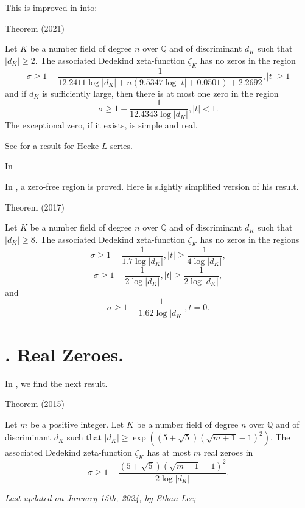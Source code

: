 This is improved in
\cite{Lee*21a}
into:
\par 
\begin{thm}{Theorem (2021)}

    Let $K$ be a number field of degree $n$ over $\mathbb{Q}$ and of
discriminant $d_K$ such that $|d_K| \ge 2$. The associated Dedekind
zeta-function $\zeta_K$ has no zeros in the region
$$
\sigma\ge 1-\frac{1}{12.2411\log|d_K|+n(9.5347\log|t|+0.0501)+2.2692}, |t|\ge1 
$$
and if $d_K$ is sufficiently large, then there is at most one zero in the region
$$
\sigma\ge 1-\frac{1}{12.4343\log|d_K|}, |t|< 1.
$$
The exceptional zero, if it exists, is simple and real.
\end{thm}


See
\cite{Ahn-Kwon*14}
for a result for Hecke $L$-series.

In

In
\cite{Louboutin*17},
a zero-free region is proved. Here is slightly simplified version of
his result.

\par 
\begin{thm}{Theorem (2017)}

Let $K$ be a number field of degree $n$ over $\mathbb{Q}$ and of
discriminant $d_K$ such that $|d_K| \ge 8$. The associated Dedekind
zeta-function $\zeta_K$ has no zeros in the regions
$$
\sigma\ge 1-\frac{1}{1.7\log|d_K|}, |t|\ge\frac{1}{4\log|d_K|},
$$
$$
\sigma\ge 1-\frac{1}{2\log|d_K|}, |t|\ge\frac{1}{2\log|d_K|},
$$
and
$$
\sigma\ge 1-\frac{1}{1.62\log|d_K|}, t=0.
$$
\end{thm}



\section{. Real Zeroes.}


In
\cite{Louboutin*15b},
we find the next result.

\par 
\begin{thm}{Theorem (2015)}

Let $m$ be a positive integer.
  Let $K$ be a number field of degree $n$ over $\mathbb{Q}$ and of
discriminant $d_K$ such that $|d_K|\ge
\exp((5+\sqrt{5})(\sqrt{m+1}-1)^2)$.
The associated Dedekind
zeta-function $\zeta_K$ has at most $m$ real zeroes in
$$
\sigma\ge 1-\frac{(5+\sqrt{5})(\sqrt{m+1}-1)^2}{2\log|d_K|}.
$$
\end{thm}







  
\begin{flushright}\small\sl{}   Last updated on January 15th, 2024, by Ethan Lee;
 \end{flushright}















